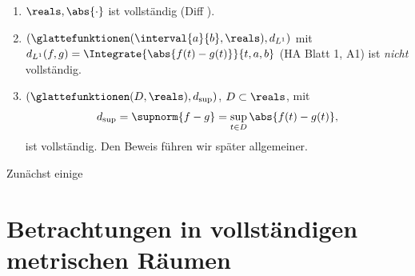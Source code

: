 \begin{beispiele}
    \begin{enumerate}
        
        \item \label{r_ist_vollstaendig} \( \reals ,\abs{\cdot} \) ist vollständig (Diff ).
        \item \label{integral_metrischer_raum_ist_nicht_vollstaendig} \( (\glattefunktionen(\interval{a}{b} ,\reals), d_{L^1})\) mit \( d_{L^1}(f,g)=\Integrate{\abs{f(t)-g(t)}}{t,a,b}\) (\vgl HA Blatt 1, A1) ist \emph{nicht} vollständig. 
        \item \( (\glattefunktionen(D,\reals ), d_{\sup})\), \( D\subset \reals \), mit
        \begin{align*}
            d_{\sup}=\supnorm{f-g}=\sup_{t\in D}\abs{f(t)-g(t)},
        \end{align*}
        ist vollständig.
        Den Beweis führen wir später allgemeiner.
    \end{enumerate}
    

\end{beispiele}
Zunächst einige 
\section*{Betrachtungen in vollständigen metrischen Räumen}

